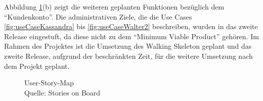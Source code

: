 	 Abbildung \ref{fig:userStoryMap}(b) zeigt die weiteren geplanten Funktionen bezüglich dem \enquote{Kundenkonto}. Die administrativen Ziele, die die Use Cases \ref{fig:useCaseKassandra} bis \ref{fig:useCaseWalter2} beschreiben, wurden in das zweite Release eingestuft, da diese nicht zu dem \enquote{Minimum Viable Product} gehören. Im Rahmen des Projektes ist die Umsetzung des Walking Skeleton geplant und das zweite Release, aufgrund der beschränkten Zeit, für die weitere Umsetzung nach dem Projekt geplant.

	\begin{figure}[H]
		\caption[User-Story-Map ]{\label{fig:userStoryMap}User-Story-Map\\ Quelle: Stories on Board}
	\end{figure} 
	 	
